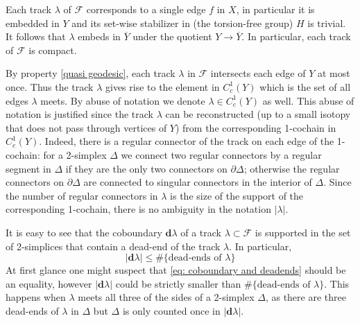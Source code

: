 \documentclass{amsart}
\numberwithin{equation}{section}
\theoremstyle{definition}
\newcommand{\bbZ}{\mathbb{Z}}
\newcommand{\bfd}{\mathbf{d}}
\newcommand{\calF}{\mathcal{F}}
\begin{document}
        Each track $\lambda$ of $\calF$ corresponds to a single edge $f$ in $X$, in particular it is embedded in $Y$ and its set-wise stabilizer in (the torsion-free group) $H$ is trivial. It follows that $\lambda$ embeds in $\overline Y$ under the quotient $Y\to \overline Y$.
        In particular, each track of $\calF$ is compact. 


        
        By property \ref{quasi geodesic}, each track $\lambda$ in $\calF$ intersects each edge of $Y$ at most once.
        Thus the track $\lambda$ gives rise to the element in $C_c^1(Y)$ which is the set of all edges $\lambda$ meets. By abuse of notation we denote $\lambda \in C_c^1(Y)$ as well.
        This abuse of notation is justified since the track $\lambda$ can be reconstructed (up to a small isotopy that does not pass through vertices of $Y$) from the corresponding 1-cochain in $C_c^1(Y)$. Indeed, there is a regular connector of the track on each edge of the 1-cochain: for a 2-simplex $\Delta$ we connect two regular connectors by a regular segment in $\Delta$ if they are the only two connectors on $\partial \Delta$;  otherwise the regular connectors on $\partial \Delta$ are connected to singular connectors in the interior of $\Delta$.
        Since the number of regular connectors in $\lambda$ is the size of the support of the corresponding 1-cochain, there is no ambiguity in the notation $|\lambda|$.
        
        It is easy to see that the coboundary $\bfd \lambda$ of a track $\lambda\subset \calF$ is supported in the set of 2-simplices that contain a dead-end of the track $\lambda$. In particular,
        \begin{equation}\label{eq: coboundary and deadends}
            |\bfd \lambda|\le \#\{\text{dead-ends of }\lambda\}
        \end{equation}
        At first glance one might suspect that \eqref{eq: coboundary and deadends} should be an equality, however $|\bfd\lambda|$ could be strictly smaller than $\#\{\text{dead-ends of }\lambda\}$. This happens when $\lambda$ meets all three of the sides of a 2-simplex $\Delta$, as there are three dead-ends of $\lambda$ in $\Delta$ but $\Delta$ is only counted once in $|\bfd\lambda|$.
\end{document}

